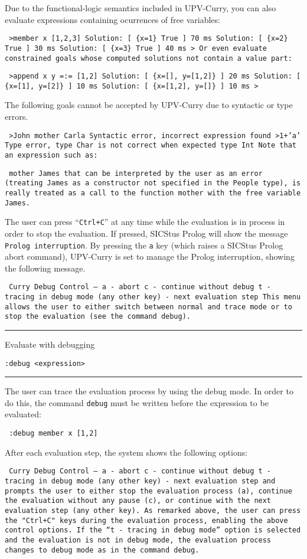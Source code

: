 \documentclass[titlepage,fleqn]{article}
\makeatletter
\newenvironment{prog}{\vspace{0.7ex}\par
\setlength{\parindent}{0.7cm}
\obeylines\@vobeyspaces\tt}
{\vspace{0.7ex}\noindent}
\newcommand{\iniprog}{\begin{prog}}
\newcommand{\finprog}{\end{prog}\noindent}
\newcommand{\pr}[1]{\mbox{\tt #1}}   %
\newcommand{\uptitle}[2]{ 
{
\noindent\rule{12.12cm}{.01in}
\vspace{0.25cm}
\noindent

{\large\sf #1}

\flushright 
\vspace{-0.78cm}
{\large\tt #2}
\vspace{0.1cm}

\noindent\rule{12.12cm}{.01in}
\vspace{0.2cm}
\hspace{-0.25cm}\noindent
}
}
\newcommand{\prompt}{\pr{>}}
\makeatother
\begin{document}
Due to the functional-logic semantics included in UPV-Curry,
you can also evaluate 
expressions containing ocurrences of free variables:
\iniprog
\prompt member x [1,2,3]
Solution: [ \{x=1\} True ] 70 ms
Solution: [ \{x=2\} True ] 30 ms
Solution: [ \{x=3\} True ] 40 ms
\prompt
\finprog
Or even evaluate constrained goals whose computed solutions 
not contain a value
part:
\iniprog
\prompt append x y =:= [1,2]
Solution: [ \{x=[], y=[1,2]\} ] 20 ms
Solution: [ \{x=[1], y=[2]\} ] 10 ms
Solution: [ \{x=[1,2], y=[]\} ] 10 ms
\prompt
\finprog

The following goals cannot be accepted by UPV-Curry due to syntactic
or type errors.
\iniprog
\prompt John mother Carla
Syntactic error, incorrect expression found
\prompt 1+'a'
Type error, type Char is not correct when expected type Int
\finprog
Note that an expression such as:
\iniprog
mother James
\finprog
that can be interpreted by the user as an error 
(treating \pr{James} as a constructor not specified in the \pr{People} type), 
is really treated as a call to
the function \pr{mother} with the free variable \pr{James}.

The user can press ``\pr{Ctrl+C}'' at any time
while the evaluation is in process in order to stop the evaluation.
If pressed, SICStus Prolog
will show the message \pr{Prolog interruption}. 
By pressing the \pr{a} key 
(which raises a SICStus Prolog abort command),
UPV-Curry is set to manage the Prolog interruption, 
showing the following message.
\iniprog
Curry Debug Control ---
a - abort
c - continue without debug
t - tracing in debug mode
(any other key) - next evaluation step
\finprog
This menu allows the user to either switch between normal and 
trace mode or to stop the evaluation (see the command \pr{debug}).

\pagebreak
\uptitle{Evaluate with debugging}{:debug <expression>}
The user can trace the evaluation process by  using the debug mode.
In order to do this, the command \pr{debug} must be written before the
expression to be evaluated:
\iniprog
:debug member x [1,2]
\finprog

After each evaluation step, the system shows the following options:
\iniprog
Curry Debug Control ---
a - abort
c - continue without debug
t - tracing in debug mode
(any other key) - next evaluation step
\finprog
and prompts the user to either stop the evaluation process (\pr{a}), 
continue the evaluation without any pause (\pr{c}), 
or continue with the next evaluation step (any other key).
As remarked above, the user can press the "\pr{Ctrl+C}" keys 
during the evaluation process, enabling 
the above control options. If the 
``\pr{t - tracing} \pr{in} \pr{debug mode}'' option is selected
and the evaluation is not in debug mode,
the evaluation process changes to debug mode as in the command
\pr{debug}.
\end{document}
